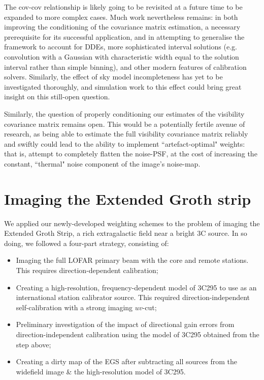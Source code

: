 \pg
The cov-cov relationship is likely going to be revisited at a future time to be expanded to more complex cases. Much work nevertheless remains: in both improving the conditioning of the covariance matrix estimation, a necessary prerequisite for its successful application, and in attempting to generalise the framework to account for DDEs, more sophisticated interval solutions (e.g. convolution with a Gaussian with characteristic width equal to the solution interval rather than simple binning), and other modern features of calibration solvers. Similarly, the effect of sky model incompleteness has yet to be investigated thoroughly, and simulation work to this effect could bring great insight on this still-open question.

\pg
Similarly, the question of properly conditioning our estimates of the visibility covariance matrix remains open. This would be a potentially fertile avenue of research, as being able to estimate the full visibility covariance matrix reliably and swiftly could lead to the ability to implement ``artefact-optimal" weights: that is, attempt to completely flatten the noise-PSF, at the cost of increasing the constant, ``thermal" noise component of the image's noise-map.



\section{Imaging the Extended Groth strip}

\pg
We applied our newly-developed weighting schemes to the problem of imaging the Extended Groth Strip, a rich extragalactic field near a bright 3C source. In so doing, we followed a four-part strategy, consisting of:
\begin{itemize}
\item Imaging the full LOFAR primary beam with the core and remote stations. This requires direction-dependent calibration;
\item Creating a high-resolution, frequency-dependent model of 3C295 to use as an international station calibrator source. This required direction-independent self-calibration with a strong imaging $uv$-cut;
\item Preliminary investigation of the impact of directional gain errors from direction-independent calibration using the model of 3C295 obtained from the step above;
\item Creating a dirty map of the EGS after subtracting all sources from the widefield image \& the high-resolution model of 3C295.
\end{itemize}

